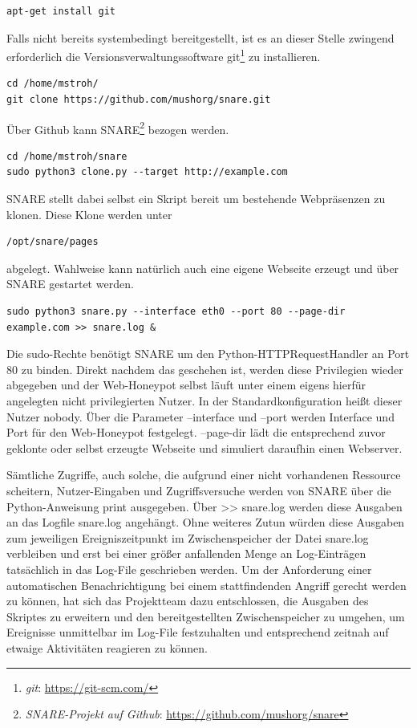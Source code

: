 \begin{lstlisting}[style=customc]
apt-get install git
\end{lstlisting}

Falls nicht bereits systembedingt bereitgestellt, ist es an dieser Stelle zwingend erforderlich die Versionsverwaltungssoftware git\footnote{ \textit{git}: \url{https://git-scm.com/}} zu installieren.

\begin{lstlisting}[style=customc]
cd /home/mstroh/
git clone https://github.com/mushorg/snare.git
\end{lstlisting}

Über Github kann SNARE\footnote{ \textit{SNARE-Projekt auf Github}: \url{https://github.com/mushorg/snare}} bezogen werden.

\begin{lstlisting}[style=customc]
cd /home/mstroh/snare
sudo python3 clone.py --target http://example.com
\end{lstlisting}

SNARE stellt dabei selbst ein Skript bereit um bestehende Webpräsenzen zu klonen. Diese Klone werden unter
\begin{lstlisting}[style=customc]
/opt/snare/pages
\end{lstlisting}
abgelegt. Wahlweise kann natürlich auch eine eigene Webseite erzeugt und über SNARE gestartet werden.

\begin{lstlisting}[style=customc]
sudo python3 snare.py --interface eth0 --port 80 --page-dir example.com >> snare.log &
\end{lstlisting}
Die sudo-Rechte benötigt SNARE um den Python-HTTPRequestHandler an Port 80 zu binden. Direkt nachdem das geschehen ist, werden diese Privilegien wieder abgegeben und der Web-Honeypot selbst läuft unter einem eigens hierfür angelegten nicht privilegierten Nutzer. In der Standardkonfiguration heißt dieser Nutzer nobody. Über die Parameter \grqq{}--interface\grqq{} und \grqq{}--port\grqq{} werden Interface und Port für den Web-Honeypot festgelegt. \grqq{}--page-dir\grqq{} lädt die entsprechend zuvor geklonte oder selbst erzeugte Webseite und simuliert daraufhin einen Webserver. 

Sämtliche Zugriffe, auch solche, die aufgrund einer nicht vorhandenen Ressource scheitern, Nutzer-Eingaben und Zugriffsversuche werden von SNARE über die Python-Anweisung print ausgegeben. Über \grqq{}>> snare.log\grqq{} werden diese Ausgaben an das Logfile \grqq{}snare.log\grqq{} angehängt.  Ohne weiteres Zutun würden diese Ausgaben zum jeweiligen Ereigniszeitpunkt im Zwischenspeicher der Datei \grqq{}snare.log\grqq{} verbleiben und erst bei einer größer anfallenden Menge an Log-Einträgen tatsächlich in das Log-File geschrieben werden. Um der Anforderung einer automatischen Benachrichtigung bei einem stattfindenden Angriff gerecht werden zu können, hat sich das Projektteam dazu entschlossen, die Ausgaben des Skriptes zu erweitern und den bereitgestellten Zwischenspeicher zu umgehen, um Ereignisse unmittelbar im Log-File festzuhalten und entsprechend zeitnah auf etwaige Aktivitäten reagieren zu können. 

